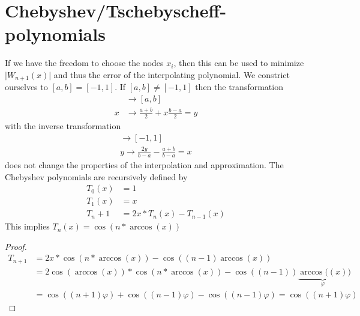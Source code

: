 \section{Chebyshev/Tschebyscheff-polynomials}\label{sec:chebyshev/tschebyscheff-polynomials}
If we have the freedom to choose the nodes $x_i$, then this can be used to minimize $\lvert W_{n+1}(x) \rvert$ and thus
the error of the interpolating polynomial.
We constrict ourselves to $[a,b] = [-1,1]$.
If  $[a,b] \neq [-1,1]$ then the transformation
\begin{align*}
[-1,1]
    &\to [a,b]\\
    x &\to \frac{a+b}{2}+x \frac{b-a}{2}=y
\end{align*}
with the inverse transformation
\begin{align*}
[a,b]
    \to [-1,1]\\
    y \to \frac{2y}{b-a}- \frac{a+b}{b-a}=x
\end{align*}
does not change the properties of the interpolation and approximation.
The Chebyshev polynomials are recursively defined by
\begin{align*}
    T_0(x) &= 1\\
    T_1(x) &= x\\
    T_n+1 &= 2x*T_n(x)-T_{n-1}(x)
\end{align*}
This implies $T_n (x)= \cos(n*\arccos(x))$
\begin{proof}
    \begin{align*}
        T_{n+1} &= 2x*\cos(n*\arccos(x))-\cos((n-1) \arccos(x))\\
        &= 2\cos (\arccos(x))*\cos(n*\arccos(x))-\cos((n-1))\underbrace{\arccos((x)}_\varphi)\\
        &= \cos((n+1) \varphi)+\cos((n-1)\varphi)-\cos((n-1)\varphi) = \cos((n+1) \varphi)
    \end{align*}
\end{proof}

